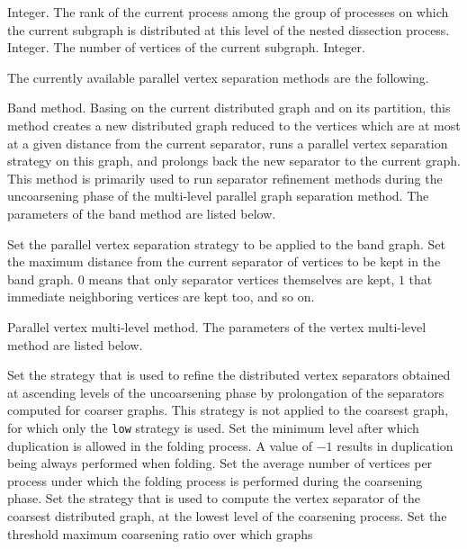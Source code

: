 \begin{itemize}
\begin{itemize}
\begin{itemize}
Integer.
\iteme[{\tt rank}]
The rank of the current process among the group of processes on
which the current subgraph is distributed at this level of the
nested dissection process.
Integer.
\iteme[{\tt vert}]
The number of vertices of the current subgraph.
Integer.
\end{itemize}
\end{itemize}
The currently available parallel vertex separation methods are the
following.
\begin{itemize}
\iteme[{\tt b}]
Band method. Basing on the current distributed graph and on its
partition, this method creates a new distributed graph reduced to the
vertices which are at most at a given distance from the current
separator, runs a parallel vertex separation strategy on this graph,
and prolongs back the new separator to the current graph. This method
is primarily used to run separator refinement methods during the
uncoarsening phase of the multi-level parallel graph separation
method. The parameters of the band method are listed below.
\begin{itemize}
\iteme[{\tt strat=}{\it strat}]
Set the parallel vertex separation strategy to be applied to the band
graph.
\iteme[{\tt width=}{\it val}]
Set the maximum distance from the current separator of vertices to be
kept in the band graph. $0$ means that only separator vertices
themselves are kept, $1$ that immediate neighboring vertices are kept
too, and so on.
\end{itemize}
\iteme[{\tt m}]
Parallel vertex multi-level method. The parameters of the vertex
multi-level method are listed below.
\begin{itemize}
\iteme[{\tt asc=}{\it strat}]
Set the strategy that is used to refine the distributed vertex
separators obtained at ascending levels of the uncoarsening phase by
prolongation of the separators computed for coarser graphs.
This strategy is not applied to the coarsest graph,
for which only the {\tt low} strategy is used.
\iteme[{\tt dlevl=}{\it nbr}]
Set the minimum level after which duplication is allowed in the
folding process. A value of $-1$ results in duplication being always
performed when folding.
\iteme[{\tt dvert=}{\it nbr}]
Set the average number of vertices per process under which
the folding process is performed during the coarsening phase.
\iteme[{\tt low=}{\it strat}]
Set the strategy that is used to compute the vertex separator of the
coarsest distributed graph,
at the lowest level of the coarsening process.
\iteme[{\tt rat=}{\it rat}]
Set the threshold maximum coarsening ratio over which graphs

\end{itemize}
\end{itemize}
\end{itemize}
